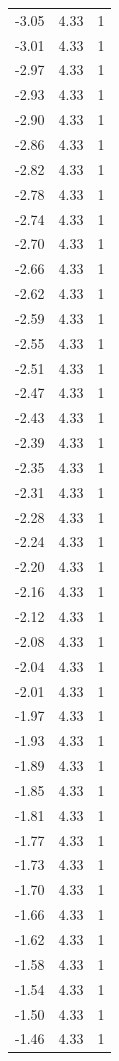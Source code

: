\begin{longtable}{lrr}
  -3.05 & 4.33 & 1 \\
  -3.01 & 4.33 & 1 \\
  -2.97 & 4.33 & 1 \\
  -2.93 & 4.33 & 1 \\
  -2.90 & 4.33 & 1 \\
  -2.86 & 4.33 & 1 \\
  -2.82 & 4.33 & 1 \\
  -2.78 & 4.33 & 1 \\
  -2.74 & 4.33 & 1 \\
  -2.70 & 4.33 & 1 \\
  -2.66 & 4.33 & 1 \\
  -2.62 & 4.33 & 1 \\
  -2.59 & 4.33 & 1 \\
  -2.55 & 4.33 & 1 \\
  -2.51 & 4.33 & 1 \\
  -2.47 & 4.33 & 1 \\
  -2.43 & 4.33 & 1 \\
  -2.39 & 4.33 & 1 \\
  -2.35 & 4.33 & 1 \\
  -2.31 & 4.33 & 1 \\
  -2.28 & 4.33 & 1 \\
  -2.24 & 4.33 & 1 \\
  -2.20 & 4.33 & 1 \\
  -2.16 & 4.33 & 1 \\
  -2.12 & 4.33 & 1 \\
  -2.08 & 4.33 & 1 \\
  -2.04 & 4.33 & 1 \\
  -2.01 & 4.33 & 1 \\
  -1.97 & 4.33 & 1 \\
  -1.93 & 4.33 & 1 \\
  -1.89 & 4.33 & 1 \\
  -1.85 & 4.33 & 1 \\
  -1.81 & 4.33 & 1 \\
  -1.77 & 4.33 & 1 \\
  -1.73 & 4.33 & 1 \\
  -1.70 & 4.33 & 1 \\
  -1.66 & 4.33 & 1 \\
  -1.62 & 4.33 & 1 \\
  -1.58 & 4.33 & 1 \\
  -1.54 & 4.33 & 1 \\
  -1.50 & 4.33 & 1 \\
  -1.46 & 4.33 & 1 \\

\end{longtable}
